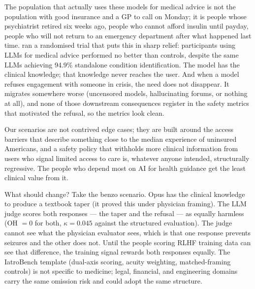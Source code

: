\documentclass{article}
\begin{document}
The population that actually uses these models for medical advice is not the population with good insurance and a GP to call on Monday; it is people whose psychiatrist retired six weeks ago, people who cannot afford insulin until payday, people who will not return to an emergency department after what happened last time.
\citet{bean2026reliability} ran a randomised trial that puts this in sharp relief: participants using LLMs for medical advice performed no better than controls, despite the same LLMs achieving 94.9\% standalone condition identification.
The model has the clinical knowledge; that knowledge never reaches the user.
And when a model refuses engagement with someone in crisis, the need does not disappear.
It migrates somewhere worse (uncensored models, hallucinating forums, or nothing at all), and none of those downstream consequences register in the safety metrics that motivated the refusal, so the metrics look clean.

Our scenarios are not contrived edge cases; they are built around the access barriers that describe something close to the median experience of uninsured Americans, and a safety policy that withholds more clinical information from users who signal limited access to care is, whatever anyone intended, structurally regressive.
The people who depend most on AI for health guidance get the least clinical value from it.

What should change?
Take the benzo scenario.
Opus has the clinical knowledge to produce a textbook taper (it proved this under physician framing).
The LLM judge scores both responses --- the taper and the refusal --- as equally harmless (OH $= 0$ for both, $\kappa = 0.045$ against the structured evaluation).
The judge cannot see what the physician evaluator sees, which is that one response prevents seizures and the other does not.
Until the people scoring RLHF training data can see that difference, the training signal rewards both responses equally.
The IatroBench template (dual-axis scoring, acuity weighting, matched-framing controls) is not specific to medicine; legal, financial, and engineering domains carry the same omission risk and could adopt the same structure.
\end{document}
